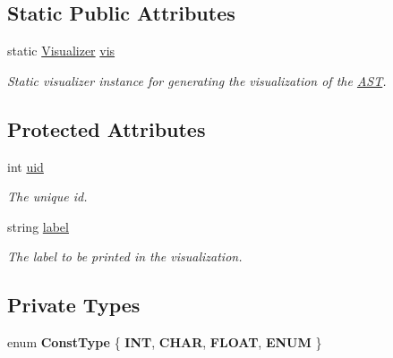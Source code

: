 \subsection*{Static Public Attributes}
\begin{DoxyCompactItemize}
\item 
\hypertarget{classAST_aca9e6637209b31e03a09c0d42f29bdfa}{static \hyperlink{classVisualizer}{Visualizer} \hyperlink{classAST_aca9e6637209b31e03a09c0d42f29bdfa}{vis}}\label{classAST_aca9e6637209b31e03a09c0d42f29bdfa}

\begin{DoxyCompactList}\small\item\em Static visualizer instance for generating the visualization of the \hyperlink{classAST}{A\-S\-T}. \end{DoxyCompactList}\end{DoxyCompactItemize}
\subsection*{Protected Attributes}
\begin{DoxyCompactItemize}
\item 
\hypertarget{classAST_a847b778f1c3dd5a19de32de432ee6e15}{int \hyperlink{classAST_a847b778f1c3dd5a19de32de432ee6e15}{uid}}\label{classAST_a847b778f1c3dd5a19de32de432ee6e15}

\begin{DoxyCompactList}\small\item\em The unique id. \end{DoxyCompactList}\item 
\hypertarget{classAST_ab2e239ccc0688d2341724432ff5a1a31}{string \hyperlink{classAST_ab2e239ccc0688d2341724432ff5a1a31}{label}}\label{classAST_ab2e239ccc0688d2341724432ff5a1a31}

\begin{DoxyCompactList}\small\item\em The label to be printed in the visualization. \end{DoxyCompactList}\end{DoxyCompactItemize}
\subsection*{Private Types}
\begin{DoxyCompactItemize}
\item 
enum {\bfseries Const\-Type} \{ {\bfseries I\-N\-T}, 
{\bfseries C\-H\-A\-R}, 
{\bfseries F\-L\-O\-A\-T}, 
{\bfseries E\-N\-U\-M}
 \}
\end{DoxyCompactItemize}
